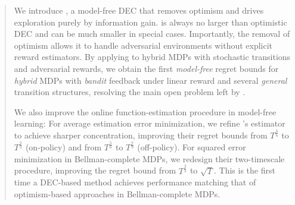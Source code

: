 \begin{abstract}

We introduce \decname, a model-free DEC that removes optimism and drives exploration purely by information gain. \decname is always no larger than optimistic DEC and can be much smaller in special cases. Importantly, the removal of optimism allows it to handle adversarial environments without explicit reward estimators. By applying \decname to hybrid MDPs with stochastic transitions and adversarial rewards, we obtain the first \emph{model-free} regret bounds for \emph{hybrid} MDPs with \emph{bandit} feedback under linear reward and several \emph{general} transition structures, resolving the main open problem left by \cite{liu2025decision}.


We also improve the online function-estimation procedure in model-free learning: For average estimation error minimization, we refine \cite{foster2024model}'s estimator to achieve sharper concentration, improving their regret bounds from $T^{\frac{3}{4}}$ to $T^{\frac{2}{3}}$ (on-policy) and from $T^{\frac{5}{6}}$ to $T^{\frac{7}{9}}$ (off-policy). For squared error minimization in Bellman-complete MDPs, we redesign their two-timescale procedure, improving the regret bound from $T^{\frac{2}{3}}$ to $\sqrt{T}$. This is the first time a DEC-based method achieves performance matching that of optimism-based approaches \citep{jin2021bellman, xie2022role} in Bellman-complete MDPs. 




\end{abstract}
